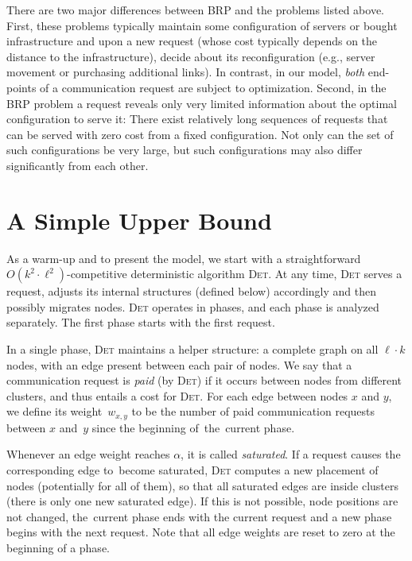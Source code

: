 \documentclass[11pt,a4paper]{scrartcl}
\newcommand{\DET}{\textsc{Det}\xspace}
\begin{document}
There are two major differences between BRP and the problems listed above.
First, these problems typically maintain some configuration of servers or
bought infrastructure and upon a new request (whose cost typically depends on
the distance to the infrastructure), decide about its reconfiguration (e.g.,
server movement or purchasing additional links). In contrast, in our model,
\emph{both} end-points of a communication request are subject to optimization.
Second, in the BRP problem a request reveals only very limited information
about the optimal configuration to serve it: There exist relatively long
sequences of requests that can be served with zero cost from a fixed
configuration. Not only can the set of such configurations be very large, but
such configurations may also differ significantly from each other.



\section{A Simple Upper Bound}
\label{sec:upper}

As a warm-up and to present the model, we start with a straightforward $O(k^2
\cdot \ell^2)$-competitive deterministic algorithm \DET. At any time, \DET
serves a request, adjusts its internal structures (defined below)
accordingly and then possibly migrates nodes. \DET operates in phases, and each
phase is analyzed separately. The first phase starts with the first request.

In a single phase, \DET maintains a helper structure: a complete graph on all
$\ell \cdot k$ nodes, with an edge present between each pair of nodes. We say
that a communication request is \emph{paid} (by \DET) if it occurs between
nodes from different clusters, and thus entails a cost for \DET. For each edge
between nodes $x$ and $y$, we define its weight~$w_{x,y}$ to be the number of
paid communication requests between $x$ and~$y$ since the beginning of~the~current phase.

Whenever an edge weight reaches $\alpha$, it is called \emph{saturated}. If a
request causes the corresponding edge to~become saturated,
\DET computes a new placement of nodes (potentially for all of them), so that all
saturated edges are inside clusters (there is only one new saturated edge). If
this is not possible, node positions are not changed, the~current phase ends
with the current request and a new phase begins with the next request. Note
that all edge weights are reset to zero at the beginning of a phase.
\end{document}
